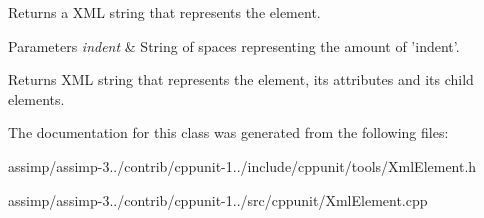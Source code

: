 Returns a X\+M\+L string that represents the element. 


\begin{DoxyParams}{Parameters}
{\em indent} & String of spaces representing the amount of 'indent'. \\
\hline
\end{DoxyParams}
\begin{DoxyReturn}{Returns}
X\+M\+L string that represents the element, its attributes and its child elements. 
\end{DoxyReturn}


The documentation for this class was generated from the following files\+:\begin{DoxyCompactItemize}
\item 
assimp/assimp-\/3../contrib/cppunit-\/1../include/cppunit/tools/Xml\+Element.\+h\item 
assimp/assimp-\/3../contrib/cppunit-\/1../src/cppunit/Xml\+Element.\+cpp\end{DoxyCompactItemize}
